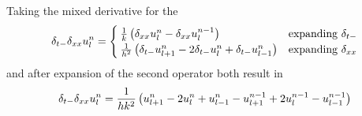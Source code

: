 Taking the mixed derivative for the 
\begin{equation*}
        \delta_{t-} \delta_{xx} u_l^n =
        \begin{cases}
            \frac{1}{k}\left(\delta_{xx} u_l^n - \delta_{xx} u_l^{n-1}\right) & \text{expanding}\ \delta_{t-}\\
            \frac{1}{h^2}\left(\delta_{t-} u_{l+1}^n - 2\delta_{t-} u_l^n + \delta_{t-} u_{l-1}^n\right) & \text{expanding}\ \delta_{xx}
        \end{cases}
\end{equation*}
and after expansion of the second operator both result in
\begin{equation}
    \delta_{t-} \delta_{xx} u_l^n = \frac{1}{hk^2}\left(u_{l+1}^n - 2 u_l^n + u_{l-1}^n - u_{l+1}^{n-1} + 2 u_l^{n-1} - u_{l-1}^{n-1}\right)
\end{equation}

\